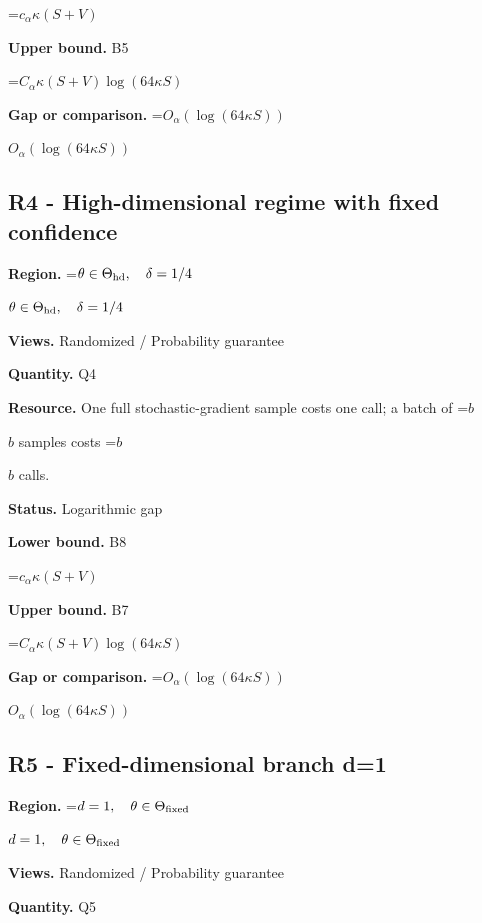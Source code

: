 \documentclass[10pt,a4paper]{article}
\newcommand{\AtlasMath}[1]{\par\begingroup\centering\setbox0=\hbox{$\displaystyle #1$}\ifdim\wd0>1.4\linewidth\typeout{ATLAS WIDE FORMULA: \the\wd0}\fi\ifdim\wd0>\linewidth\resizebox{\linewidth}{!}{\box0}\else\box0\fi\par\endgroup}
\newcommand{\AtlasInlineMath}[1]{\begingroup\setbox0=\hbox{$#1$}\ifdim\wd0>.4\linewidth\endgroup\AtlasMath{#1}\else\endgroup$#1$\fi}
\begin{document}
\AtlasMath{c_\alpha\kappa(S+V)}


\textbf{Upper bound.} B5



\AtlasMath{C_\alpha\kappa(S+V)\log(64\kappa S)}


\textbf{Gap or comparison.} \AtlasInlineMath{O_\alpha(\log(64\kappa S))}



\subsection{R4 - High-dimensional regime with fixed confidence}


\textbf{Region.} \AtlasInlineMath{\theta\in\Theta_{\rm hd},\quad\delta=1/4}



\textbf{Views.} Randomized / Probability guarantee



\textbf{Quantity.} Q4



\textbf{Resource.} One full stochastic-gradient sample costs one call; a batch of \AtlasInlineMath{b} samples costs \AtlasInlineMath{b} calls.



\textbf{Status.} Logarithmic gap



\textbf{Lower bound.} B8



\AtlasMath{c_\alpha\kappa(S+V)}


\textbf{Upper bound.} B7



\AtlasMath{C_\alpha\kappa(S+V)\log(64\kappa S)}


\textbf{Gap or comparison.} \AtlasInlineMath{O_\alpha(\log(64\kappa S))}



\subsection{R5 - Fixed-dimensional branch d=1}


\textbf{Region.} \AtlasInlineMath{d=1,\quad\theta\in\Theta_{\rm fixed}}



\textbf{Views.} Randomized / Probability guarantee



\textbf{Quantity.} Q5
\end{document}
